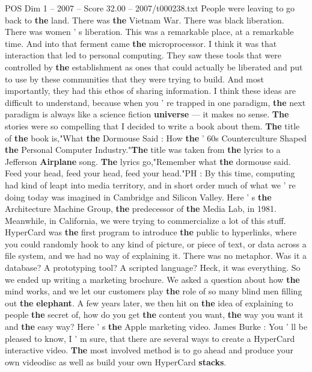 \begin{textsample}{POS Dim 1 – 2007 – Score 32.00 – 2007/t000238.txt}
People were leaving to go back to \textbf{the} land.
There was \textbf{the} Vietnam War.
There was black liberation.
There was women ' s liberation.
This was a remarkable place, at a remarkable time.
And into that ferment came \textbf{the} microprocessor.
I think it was that interaction that led to personal computing.
They saw these tools that were controlled by \textbf{the} establishment as ones that could actually be liberated and put to use by these communities that they were trying to build.
And most importantly, they had this ethos of sharing information.
I think these ideas are difficult to understand, because when you ' re trapped in one paradigm, \textbf{the} next paradigm is always like a science fiction \textbf{universe} — it makes no sense. \textbf{The} stories were so compelling that I decided to write a book about them. \textbf{The} title of \textbf{the} book is,"What \textbf{the} Dormouse Said : How \textbf{the} ' 60s Counterculture Shaped \textbf{the} Personal Computer Industry."\textbf{The} title was taken from \textbf{the} lyrics to a Jefferson \textbf{Airplane} song. \textbf{The} lyrics go,"Remember what \textbf{the} dormouse said.
Feed your head, feed your head, feed your head."PH : By this time, computing had kind of leapt into media territory, and in short order much of what we ' re doing today was imagined in Cambridge and Silicon Valley.
Here ' s \textbf{the} Architecture Machine Group, \textbf{the} predecessor of \textbf{the} Media Lab, in 1981.
Meanwhile, in California, we were trying to commercialize a lot of this stuff.
HyperCard was \textbf{the} first program to introduce \textbf{the} public to hyperlinks, where you could randomly hook to any kind of picture, or piece of text, or data across a file system, and we had no way of explaining it.
There was no metaphor.
Was it a database?
A prototyping tool?
A scripted language?
Heck, it was everything.
So we ended up writing a marketing brochure.
We asked a question about how \textbf{the} mind works, and we let our customers play \textbf{the} role of so many blind men filling out \textbf{the} \textbf{elephant}.
A few years later, we then hit on \textbf{the} idea of explaining to people \textbf{the} secret of, how do you get \textbf{the} content you want, \textbf{the} way you want it and \textbf{the} easy way?
Here ' s \textbf{the} Apple marketing video.
James Burke : You ' ll be pleased to know, I ' m sure, that there are several ways to create a HyperCard interactive video. \textbf{The} most involved method is to go ahead and produce your own videodisc as well as build your own HyperCard \textbf{stacks}.

\end{textsample}
